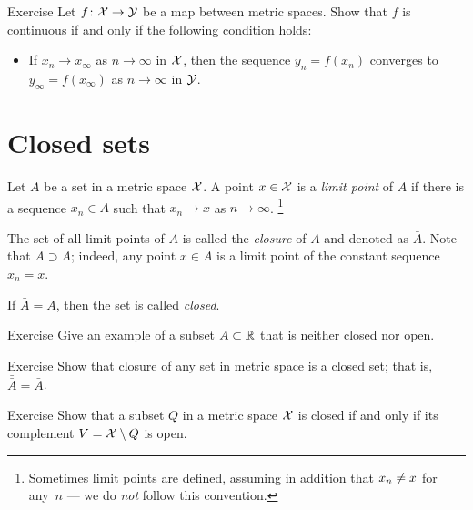 \begin{thm}{Exercise}\label{ex:continuous-limit}
Let $f\colon\mathcal{X}\to\mathcal{Y}$ be a map between metric spaces.
Show that $f$ is continuous if and only if the following condition holds:
\begin{itemize}
 \item If $x_n\to x_\infty$ as $n\to\infty$ in $\mathcal{X}$, then the sequence $y_n=f(x_n)$ converges to $y_\infty=f(x_\infty)$ as $n\to\infty$ in $\mathcal{Y}$.
\end{itemize}

\end{thm}


\section{Closed sets}

Let $A$ be a set in a metric space $\mathcal{X}$.
A point $x\in \mathcal{X}$ is a \emph{limit point} of $A$ if there is a sequence $x_n\in A$ such that $x_n\to x$ as $n\to\infty$.%
\footnote{Sometimes limit points are defined, assuming in addition that $x_n\z\ne x$ for any~$n$ --- we do \textit{not} follow this convention.}

The set of all limit points of $A$ is called the \emph{closure} of $A$ and denoted as $\bar A$.
Note that $\bar A\supset A$;
indeed, any point $x\in A$ is a limit point of the constant sequence $x_n=x$.

If $\bar A= A$, then the set is called \emph{closed}.

\begin{thm}{Exercise}\label{ex:nonclosed-nonopen}
Give an example of a subset $A\subset\mathbb{R}$ that is neither closed nor open. 
\end{thm}

\begin{thm}{Exercise}\label{ex:closure-is-closed}
Show that closure of any set in metric space is a closed set;
that is, $\bar{\bar A}= \bar A$.
\end{thm}

\begin{thm}{Exercise}\label{ex:closed-open-complement}
Show that a subset $Q$ in a metric space $\mathcal{X}$ is closed if and only if its complement $V=\mathcal{X}\setminus Q$ is open.
\end{thm}
